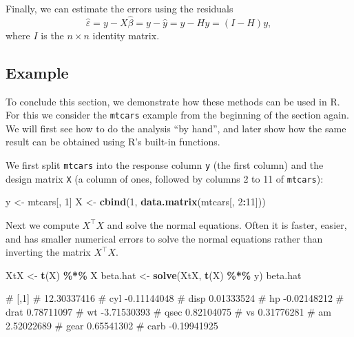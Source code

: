 \documentclass[
  a4paper,
]{article}
\newenvironment{Shaded}{\begin{snugshade}}{\end{snugshade}}
\newcommand{\DecValTok}[1]{\textcolor[rgb]{0.00,0.00,0.81}{#1}}
\newcommand{\FunctionTok}[1]{\textcolor[rgb]{0.13,0.29,0.53}{\textbf{#1}}}
\newcommand{\NormalTok}[1]{#1}
\newcommand{\OtherTok}[1]{\textcolor[rgb]{0.56,0.35,0.01}{#1}}
\newcommand{\SpecialCharTok}[1]{\textcolor[rgb]{0.81,0.36,0.00}{\textbf{#1}}}
\theoremstyle{definition}
\theoremstyle{definition}
\theoremstyle{definition}
\theoremstyle{definition}
\theoremstyle{remark}
\begin{document}
Finally, we can estimate the errors using the residuals
\begin{equation}
  \hat\varepsilon
  = y - X \hat\beta
  = y - \hat y
  = y - H y
  = (I - H) y,  \label{eq:fitted-errors}
\end{equation}
where \(I\) is the \(n\times n\) identity matrix.

\subsection{Example}\label{example}

To conclude this section, we demonstrate how these methods can be used
in R. For this we consider the \texttt{mtcars} example from the beginning of
the section again. We will first see how to do the analysis ``by hand'',
and later show how the same result can be obtained using R's built-in functions.

We first split \texttt{mtcars} into the response column \texttt{y} (the first column)
and the design matrix \texttt{X} (a column of ones, followed by columns 2 to 11
of \texttt{mtcars}):

\begin{Shaded}
\begin{Highlighting}[]
\NormalTok{y }\OtherTok{\textless{}{-}}\NormalTok{ mtcars[, }\DecValTok{1}\NormalTok{]}
\NormalTok{X }\OtherTok{\textless{}{-}} \FunctionTok{cbind}\NormalTok{(}\DecValTok{1}\NormalTok{, }\FunctionTok{data.matrix}\NormalTok{(mtcars[, }\DecValTok{2}\SpecialCharTok{:}\DecValTok{11}\NormalTok{]))}
\end{Highlighting}
\end{Shaded}

Next we compute \(X^\top X\) and solve the normal equations. Often it is
faster, easier, and has smaller numerical errors to solve the normal equations
rather than inverting the matrix \(X^\top X\).

\begin{Shaded}
\begin{Highlighting}[]
\NormalTok{XtX }\OtherTok{\textless{}{-}} \FunctionTok{t}\NormalTok{(X) }\SpecialCharTok{\%*\%}\NormalTok{ X}
\NormalTok{beta.hat }\OtherTok{\textless{}{-}} \FunctionTok{solve}\NormalTok{(XtX, }\FunctionTok{t}\NormalTok{(X) }\SpecialCharTok{\%*\%}\NormalTok{ y)}
\NormalTok{beta.hat}
\end{Highlighting}
\end{Shaded}

\begin{Shaded}
\begin{Highlighting}[]
\NormalTok{\#             [,1]}
\NormalTok{\#      12.30337416}
\NormalTok{\# cyl  {-}0.11144048}
\NormalTok{\# disp  0.01333524}
\NormalTok{\# hp   {-}0.02148212}
\NormalTok{\# drat  0.78711097}
\NormalTok{\# wt   {-}3.71530393}
\NormalTok{\# qsec  0.82104075}
\NormalTok{\# vs    0.31776281}
\NormalTok{\# am    2.52022689}
\NormalTok{\# gear  0.65541302}
\NormalTok{\# carb {-}0.19941925}
\end{Highlighting}
\end{Shaded}
\end{document}
